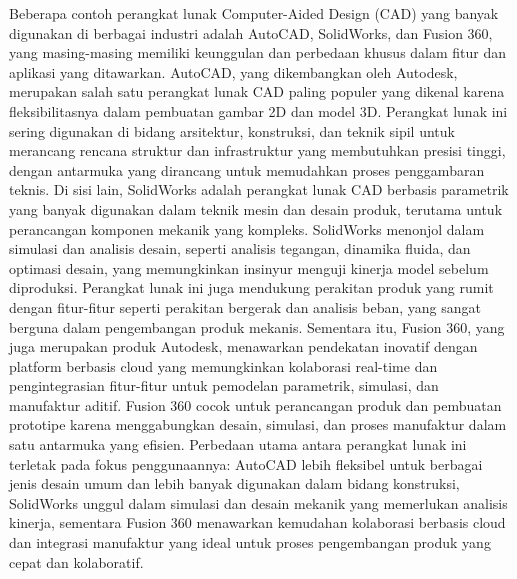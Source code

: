 Beberapa contoh perangkat lunak Computer-Aided Design (CAD) yang banyak digunakan di berbagai industri
adalah AutoCAD, SolidWorks, dan Fusion 360, yang masing-masing memiliki keunggulan dan perbedaan 
khusus dalam fitur dan aplikasi yang ditawarkan. AutoCAD, yang dikembangkan oleh Autodesk, merupakan 
salah satu perangkat lunak CAD paling populer yang dikenal karena fleksibilitasnya dalam pembuatan 
gambar 2D dan model 3D. Perangkat lunak ini sering digunakan di bidang arsitektur, konstruksi, dan 
teknik sipil untuk merancang rencana struktur dan infrastruktur yang membutuhkan presisi tinggi, 
dengan antarmuka yang dirancang untuk memudahkan proses penggambaran teknis. Di sisi lain, 
SolidWorks adalah perangkat lunak CAD berbasis parametrik yang banyak digunakan dalam teknik 
mesin dan desain produk, terutama untuk perancangan komponen mekanik yang kompleks. 
SolidWorks menonjol dalam simulasi dan analisis desain, seperti analisis tegangan, dinamika fluida, 
dan optimasi desain, yang memungkinkan insinyur menguji kinerja model sebelum diproduksi. 
Perangkat lunak ini juga mendukung perakitan produk yang rumit dengan fitur-fitur seperti perakitan 
bergerak dan analisis beban, yang sangat berguna dalam pengembangan produk mekanis. Sementara itu, 
Fusion 360, yang juga merupakan produk Autodesk, menawarkan pendekatan inovatif dengan platform 
berbasis cloud yang memungkinkan kolaborasi real-time dan pengintegrasian fitur-fitur untuk 
pemodelan parametrik, simulasi, dan manufaktur aditif. Fusion 360 cocok untuk perancangan produk 
dan pembuatan prototipe karena menggabungkan desain, simulasi, dan proses manufaktur dalam satu 
antarmuka yang efisien. Perbedaan utama antara perangkat lunak ini terletak pada fokus penggunaannya: 
AutoCAD lebih fleksibel untuk berbagai jenis desain umum dan lebih banyak digunakan dalam bidang 
konstruksi, SolidWorks unggul dalam simulasi dan desain mekanik yang memerlukan analisis kinerja, 
sementara Fusion 360 menawarkan kemudahan kolaborasi berbasis cloud dan integrasi manufaktur yang 
ideal untuk proses pengembangan produk yang cepat dan kolaboratif. \parencite{masteringcad}


